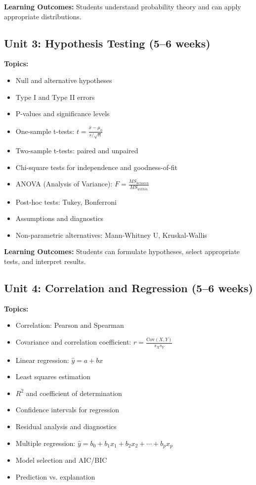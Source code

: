 \documentclass[12pt,oneside]{book}
\begin{document}
\textbf{Learning Outcomes:} Students understand probability theory and can apply appropriate distributions.

\subsection{Unit 3: Hypothesis Testing (5--6 weeks)}

\textbf{Topics:}
\begin{itemize}
    \item Null and alternative hypotheses
    \item Type I and Type II errors
    \item P-values and significance levels
    \item One-sample t-tests: $t = \frac{\bar{x} - \mu_0}{s/\sqrt{n}}$
    \item Two-sample t-tests: paired and unpaired
    \item Chi-square tests for independence and goodness-of-fit
    \item ANOVA (Analysis of Variance): $F = \frac{MS_{between}}{MS_{within}}$
    \item Post-hoc tests: Tukey, Bonferroni
    \item Assumptions and diagnostics
    \item Non-parametric alternatives: Mann-Whitney U, Kruskal-Wallis
\end{itemize}

\textbf{Learning Outcomes:} Students can formulate hypotheses, select appropriate tests, and interpret results.

\subsection{Unit 4: Correlation and Regression (5--6 weeks)}

\textbf{Topics:}
\begin{itemize}
    \item Correlation: Pearson and Spearman
    \item Covariance and correlation coefficient: $r = \frac{\text{Cov}(X,Y)}{s_X s_Y}$
    \item Linear regression: $\hat{y} = a + bx$
    \item Least squares estimation
    \item $R^2$ and coefficient of determination
    \item Confidence intervals for regression
    \item Residual analysis and diagnostics
    \item Multiple regression: $\hat{y} = b_0 + b_1x_1 + b_2x_2 + \cdots + b_px_p$
    \item Model selection and AIC/BIC
    \item Prediction vs. explanation
\end{itemize}
\end{document}
